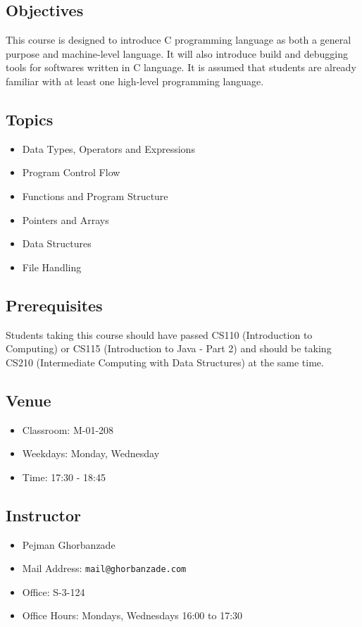 \documentclass[12pt,letterpaper,twoside]{article}
\begin{document}


\subsection*{Objectives}
This course is designed to introduce C programming language as both a general purpose and machine-level language.
It will also introduce build and debugging tools for softwares written in C language.
It is assumed that students are already familiar with at least one high-level programming language.

\subsection*{Topics}
\begin{itemize}
\item[] Data Types, Operators and Expressions
\item[] Program Control Flow
\item[] Functions and Program Structure
\item[] Pointers and Arrays
\item[] Data Structures
\item[] File Handling
\end{itemize}

\subsection*{Prerequisites}
Students taking this course should have passed CS110 (Introduction to Computing) or CS115 (Introduction to Java - Part 2) and should be taking CS210 (Intermediate Computing with Data Structures) at the same time.

\subsection*{Venue}
\begin{itemize}
\item[] Classroom: M-01-208
\item[] Weekdays: Monday, Wednesday
\item[] Time: 17:30 - 18:45
\end{itemize}

\subsection*{Instructor}
\begin{itemize}
\item[] Pejman Ghorbanzade
\item[] Mail Address: \texttt{mail@ghorbanzade.com}
\item[] Office: S-3-124
\item[] Office Hours: Mondays, Wednesdays 16:00 to 17:30
\end{itemize}
\end{document}
